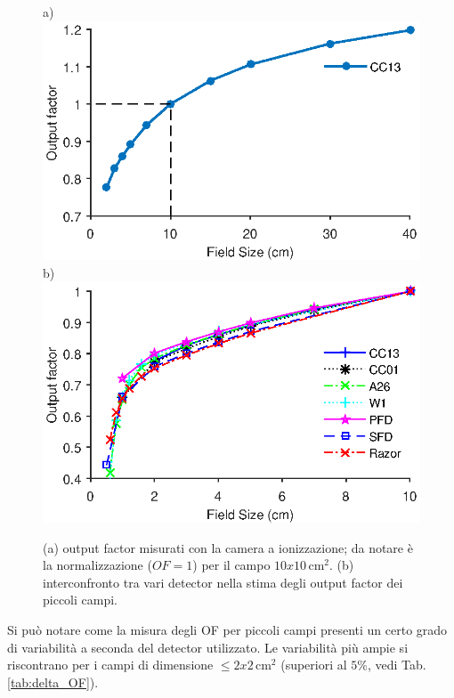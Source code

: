 \begin{figure}
\centering
a)\includegraphics[width=.8\textwidth]{./cap2/OF_plots/OFCC13.eps}\\
b)\includegraphics[width=.8\textwidth]{./cap2/OF_plots/OFSmall.eps}
\caption{(a) output factor misurati con la camera a ionizzazione; da notare è la normalizzazione ($OF=1$) per il campo $10x10\,$cm$^2$. (b) interconfronto tra vari detector nella stima degli output factor dei piccoli campi.}
\label{fig:OF_res}
\end{figure}
Si può notare come la misura degli OF per piccoli campi presenti un certo grado di variabilità a seconda del detector utilizzato. Le variabilità più ampie si riscontrano per i campi di dimensione $\leq 2x2\,$cm$^2$ (superiori al $5\%$, vedi Tab.\ref{tab:delta_OF}). 

